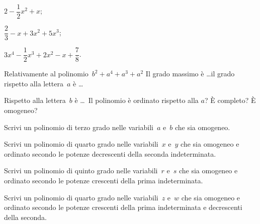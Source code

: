 \begin{multicols}{2}
\begin{esercizio}
\begin{enumeratea}
\item $2-\dfrac{1}{2}x^2+x$;
\item $\dfrac{2}{3}-x+3x^2+5x^3$;
\item $3x^4-\dfrac{1}{2}x^3+2x^2-x+\dfrac{7}{8}$.
\end{enumeratea}
\end{esercizio}

\begin{esercizio}
\label{ese:11.5}
Relativamente al polinomio~$b^2+a^4+a^3+a^2$ Il grado massimo è \ldots il grado rispetto alla lettera~$a$ è \ldots 

Rispetto alla lettera~$b$ è \ldots\, Il polinomio è ordinato rispetto alla $a$? È completo? È omogeneo?
\end{esercizio}

\begin{esercizio}
\label{ese:11.6}
Scrivi un polinomio di terzo grado nelle variabili~$a$ e~$b$ che sia omogeneo.
\end{esercizio}

\begin{esercizio}
\label{ese:11.7}
Scrivi un polinomio di quarto grado nelle variabili~$x$ e~$y$ che sia omogeneo e ordinato secondo le
potenze decrescenti della seconda indeterminata.
\end{esercizio}

\begin{esercizio}
\label{ese:11.8}
Scrivi un polinomio di quinto grado nelle variabili~$r$ e~$s$ che sia omogeneo e ordinato secondo le
potenze crescenti della prima indeterminata.
\end{esercizio}

\begin{esercizio}
\label{ese:11.9}
Scrivi un polinomio di quarto grado nelle variabili~$z$ e~$w$ che sia omogeneo e ordinato secondo le
potenze crescenti della prima indeterminata e decrescenti della seconda.
\end{esercizio}


\end{multicols}
